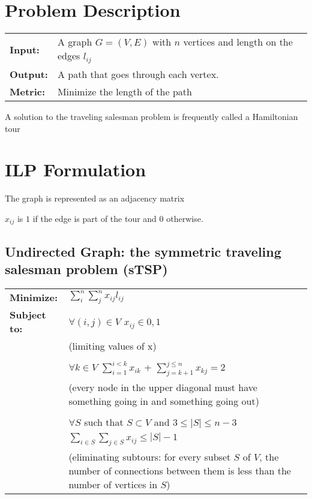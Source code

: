 \documentclass{article}
\begin{document}
\section{Problem Description}
\begin{tabular}{l p{10cm}}
  \textbf{Input:} & A graph $G = (V, E)$ with $n$ vertices and length on the
  edges $l_{ij}$ \\
  \textbf{Output:} & A path that goes through each vertex.\\
  \textbf{Metric:} & Minimize the length of the path\\
\end{tabular}

A solution to the traveling salesman problem is frequently called a Hamiltonian
tour

\section{ILP Formulation}
The graph is represented as an adjacency matrix

$x_{ij}$ is $1$ if the edge is part of the tour and $0$ otherwise.

\subsection{Undirected Graph: the symmetric traveling salesman problem (sTSP)}
\begin{tabular}{l p{10cm}}
  \textbf{Minimize:} & $\sum_{i}^{n} \sum_{j}^{n} x_{ij} l_{ij}$ \\
  \textbf{Subject to:} & $\forall{(i, j) \in V}$ $x_{ij} \in {0, 1}$ \\
  & (limiting values of x) \\
  & \\
  & $\forall{k \in V}$ $\sum_{i=1}^{i<k} x_{ik}$ + $\sum_{j=k+1}^{j \leq n}
  x_{kj} = 2$ \\
  & (every node in the upper diagonal must have something going in and
  something going out) \\
  & \\
  & $\forall {S}$ such that $ S \subset V$ and $3 \leq |S| \leq n - 3$ \\
  & $\sum_{i \in S} \sum_{j \in S} x_{ij} \leq |S| - 1$ \\
  & (eliminating subtours: for every subset $S$ of $V$, the number of
  connections between them is less than the number of vertices in $S$) \\
\end{tabular}
\end{document}
